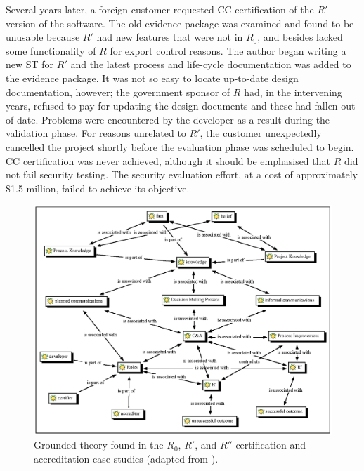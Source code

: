\documentclass[10pt,letterpaper,conference]{IEEEtran}
\begin{document}
Several years later, a foreign customer requested CC certification of the $R'$ version of the
software. The old evidence package was examined and found to be unusable because $R'$ had new
features that were not in $R_0$, and besides lacked some functionality of $R$ for export control
reasons. The author began writing a new ST for $R'$ and the latest process and life-cycle
documentation was added to the evidence package. It was not so easy to locate up-to-date design
documentation, however; the government sponsor of $R$ had, in the intervening years, refused to
pay for updating the design documents and these had fallen out of date. Problems were encountered
by the developer as a result during the validation phase. For reasons unrelated to $R'$, the
customer unexpectedly cancelled the project shortly before the evaluation phase was scheduled to
begin. CC certification was never achieved, although it should be emphasised that $R$ did not
fail security testing. The security evaluation effort, at a cost of approximately \$1.5 million,
failed to achieve its objective.

\begin{figure}[!t]
    \centering
	\includegraphics[width=\textwidth,bb=68 409 532 766]{network_grounded_theory_scaled_100.eps}
	\caption{Grounded theory found in the $R_0$, $R'$, and $R''$
		certification and accreditation case studies (adapted from \cite[Ch.\ 5]{Loughry2012b}).}
	\label{figure:grounded-theory}
\end{figure}
\end{document}
